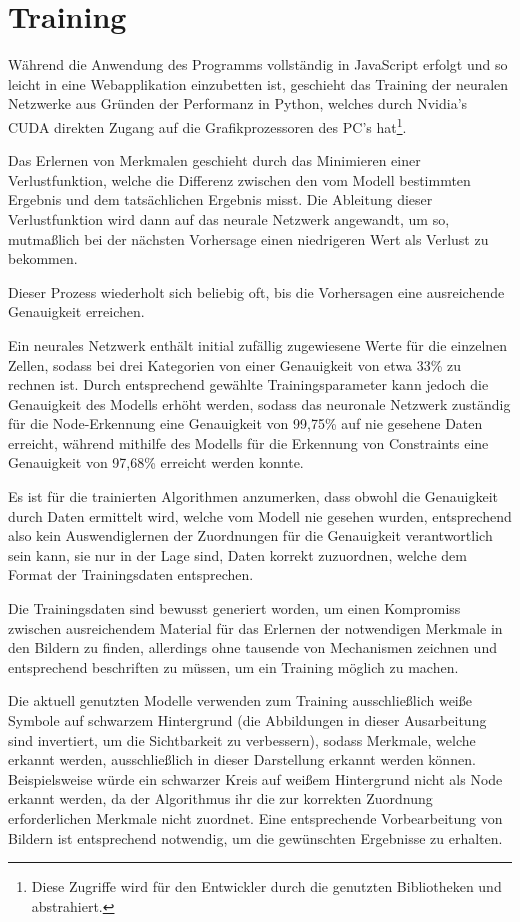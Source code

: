 \section{Training}
Während die Anwendung des Programms vollständig in JavaScript erfolgt und so leicht in eine Webapplikation einzubetten ist, geschieht das Training der neuralen Netzwerke aus Gründen der Performanz in Python, welches durch Nvidia's CUDA\cite{nvidia2019} direkten Zugang auf die Grafikprozessoren des PC's hat\footnote{Diese Zugriffe wird für den Entwickler durch die genutzten Bibliotheken  und  abstrahiert.}.

Das Erlernen von Merkmalen geschieht durch das Minimieren einer Verlustfunktion, welche die Differenz zwischen den vom Modell bestimmten Ergebnis und dem tatsächlichen Ergebnis misst.
Die Ableitung dieser Verlustfunktion wird dann auf das neurale Netzwerk angewandt, um so, mutmaßlich bei der nächsten Vorhersage einen niedrigeren Wert als Verlust zu bekommen.

Dieser Prozess wiederholt sich beliebig oft, bis die Vorhersagen eine ausreichende Genauigkeit erreichen.

Ein neurales Netzwerk enthält initial zufällig zugewiesene Werte für die einzelnen Zellen, sodass bei drei Kategorien von einer Genauigkeit von etwa 33\% zu rechnen ist.
Durch entsprechend gewählte Trainingsparameter kann jedoch die Genauigkeit des Modells erhöht werden, sodass das neuronale Netzwerk zuständig für die Node-Erkennung eine Genauigkeit von 99,75\% auf nie gesehene Daten erreicht, während mithilfe des Modells für die Erkennung von Constraints eine Genauigkeit von 97,68\% erreicht werden konnte.

Es ist für die trainierten Algorithmen anzumerken, dass obwohl die Genauigkeit durch Daten ermittelt wird, welche vom Modell nie gesehen wurden, entsprechend also kein Auswendiglernen der Zuordnungen\cite[p.705]{StuartRussell2018} für die Genauigkeit verantwortlich sein kann, sie nur in der Lage sind, Daten korrekt zuzuordnen, welche dem Format der Trainingsdaten entsprechen.

Die Trainingsdaten sind bewusst generiert worden, um einen Kompromiss zwischen ausreichendem Material für das Erlernen der notwendigen Merkmale in den Bildern zu finden, allerdings ohne tausende von Mechanismen zeichnen und entsprechend beschriften zu müssen, um ein Training möglich zu machen.

Die aktuell genutzten Modelle verwenden zum Training ausschließlich weiße Symbole auf schwarzem Hintergrund (die Abbildungen in dieser Ausarbeitung sind invertiert, um die Sichtbarkeit zu verbessern), sodass Merkmale, welche erkannt werden, ausschließlich in dieser Darstellung erkannt werden können. Beispielsweise würde ein schwarzer Kreis auf weißem Hintergrund nicht als Node erkannt werden, da der Algorithmus ihr die zur korrekten Zuordnung erforderlichen Merkmale nicht zuordnet.
Eine entsprechende Vorbearbeitung von Bildern ist entsprechend notwendig, um die gewünschten Ergebnisse zu erhalten.
